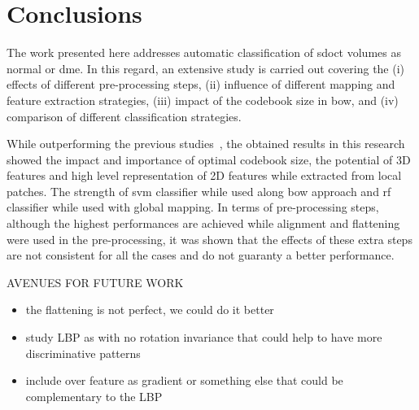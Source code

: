 \documentclass[review]{elsarticle}
\begin{document}
\maketitle

\linenumbers
\acresetall  %




%

\section{Conclusions}\label{sec:con}
The work presented here addresses automatic classification of \ac{sdoct} volumes as normal or \ac{dme}.
In this regard, an extensive study is carried out covering the
(i) effects of different pre-processing steps, 
(ii) influence of different mapping and feature extraction strategies,
(iii) impact of the codebook size in \ac{bow}, and
(iv) comparison of different classification strategies.

While outperforming the previous studies~\cite{Lemaintre2015miccaiOCT,Venhuizen2015}, the obtained results in this research showed the impact and importance of optimal codebook size, the potential of 3D features and high level representation of 2D features while extracted from local patches.
The strength of \ac{svm} classifier while used along \ac{bow} approach and \ac{rf} classifier while used with global mapping.
In terms of pre-processing steps, although the highest performances are achieved while alignment and flattening were used in the pre-processing, it was shown that the effects of these extra steps are not consistent for all the cases and do not guaranty a better performance.

{\color{red} AVENUES FOR FUTURE WORK
\begin{itemize}
  \item the flattening is not perfect, we could do it better
  \item study LBP as with no rotation invariance that could help to have more discriminative patterns
  \item include over feature as gradient or something else that could be complementary to the LBP
\end{itemize}}
\end{document}
